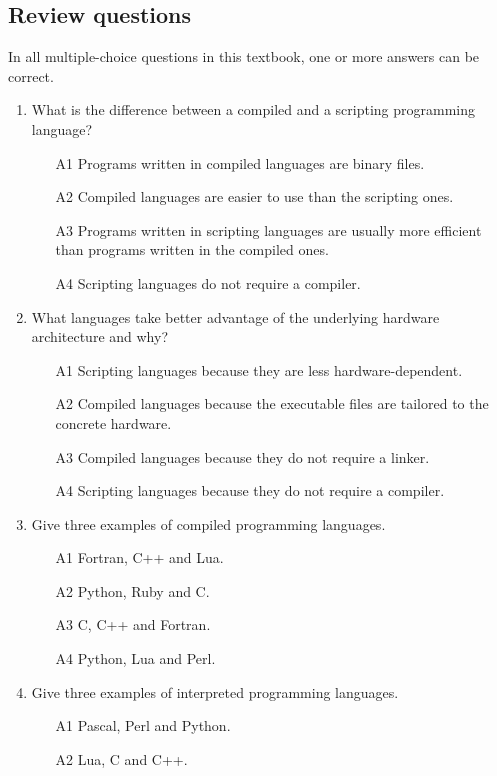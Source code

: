 \documentclass[article,A4,12pt]{llncs}
\begin{document}
\subsection{Review questions}

In all multiple-choice questions in this textbook, one or more answers can be correct. 
\begin{enumerate}
\item What is the difference between a compiled and a scripting programming language?
\begin{enumerate}
\item[A1] Programs written in compiled languages are binary files. 
\item[A2] Compiled languages are easier to use than the scripting ones.
\item[A3] Programs written in scripting languages are usually more efficient than programs 
          written in the compiled ones.
\item[A4] Scripting languages do not require a compiler.
\end{enumerate}
\item What languages take better advantage of the underlying hardware architecture
      and why?
\begin{enumerate}
\item[A1] Scripting languages because they are less hardware-dependent.
\item[A2] Compiled languages because the executable files are tailored 
          to the concrete hardware.
\item[A3] Compiled languages because  they do not require a linker.
\item[A4] Scripting languages because they do not require a compiler.
\end{enumerate}
\item Give three examples of compiled programming languages.
\begin{enumerate}
\item[A1] Fortran, C++ and Lua.
\item[A2] Python, Ruby and C.
\item[A3] C, C++ and Fortran.
\item[A4] Python, Lua and Perl.
\end{enumerate}
\item Give three examples of interpreted programming languages.
\begin{enumerate}
\item[A1] Pascal, Perl and Python.
\item[A2] Lua, C and C++.

\end{enumerate}
\end{enumerate}
\end{document}
